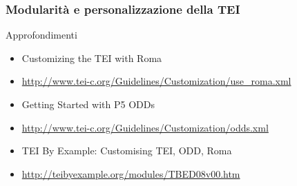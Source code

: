 \begin{frame}
    \frametitle{Modularità e personalizzazione della TEI}
    \addtocounter{nframe}{1}

    \begin{block}{Approfondimenti}
            \begin{itemize}
                \item Customizing the TEI with Roma
                \item [] \url{http://www.tei-c.org/Guidelines/Customization/use_roma.xml}
                \item Getting Started with P5 ODDs
                \item [] \url{http://www.tei-c.org/Guidelines/Customization/odds.xml}
                \item TEI By Example: Customising TEI, ODD, Roma
                \item [] \url{http://teibyexample.org/modules/TBED08v00.htm}
            \end{itemize} 
    \end{block}

\end{frame}
